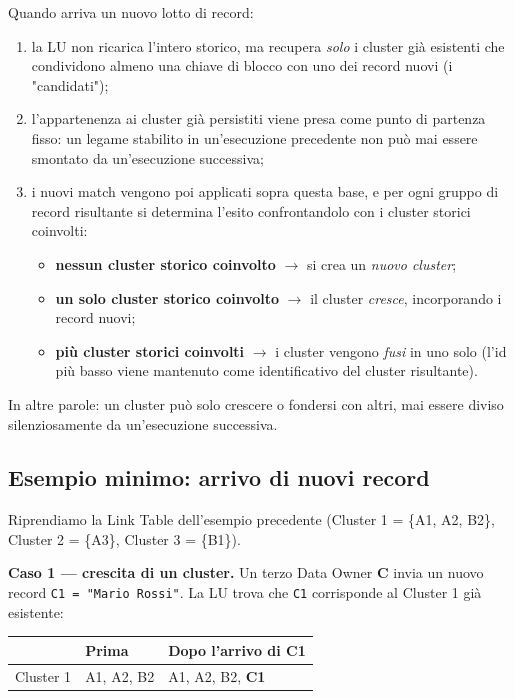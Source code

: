 \documentclass[11pt,a4paper]{article}
\begin{document}
Quando arriva un nuovo lotto di record:

\begin{enumerate}
    \item la LU non ricarica l'intero storico, ma recupera \emph{solo} i
        cluster gi\`a esistenti che condividono almeno una chiave di blocco
        con uno dei record nuovi (i "candidati");
    \item l'appartenenza ai cluster gi\`a persistiti viene presa come punto di
        partenza fisso: un legame stabilito in un'esecuzione precedente non
        pu\`o mai essere smontato da un'esecuzione successiva;
    \item i nuovi match vengono poi applicati sopra questa base, e per ogni
        gruppo di record risultante si determina l'esito confrontandolo con i
        cluster storici coinvolti:
    \begin{itemize}[nosep]
        \item \textbf{nessun cluster storico coinvolto} $\rightarrow$ si crea
            un \emph{nuovo cluster};
        \item \textbf{un solo cluster storico coinvolto} $\rightarrow$ il
            cluster \emph{cresce}, incorporando i record nuovi;
        \item \textbf{pi\`u cluster storici coinvolti} $\rightarrow$ i cluster
            vengono \emph{fusi} in uno solo (l'id pi\`u basso viene mantenuto
            come identificativo del cluster risultante).
    \end{itemize}
\end{enumerate}

In altre parole: un cluster pu\`o solo crescere o fondersi con altri, mai
essere diviso silenziosamente da un'esecuzione successiva.

\subsection{Esempio minimo: arrivo di nuovi record}

Riprendiamo la Link Table dell'esempio precedente (Cluster 1 = \{A1, A2, B2\},
Cluster 2 = \{A3\}, Cluster 3 = \{B1\}).

\medskip
\noindent\textbf{Caso 1 --- crescita di un cluster.} Un terzo Data Owner
\textbf{C} invia un nuovo record \texttt{C1 = "Mario Rossi"}. La LU trova che
\texttt{C1} corrisponde al Cluster 1 gi\`a esistente:

\begin{table}[h!]
\centering
\begin{tabular}{@{}lll@{}}
\toprule
 & \textbf{Prima} & \textbf{Dopo l'arrivo di C1} \\
\midrule
Cluster 1 & A1, A2, B2 & A1, A2, B2, \textbf{C1} \\
\bottomrule
\end{tabular}
\end{table}
\end{document}
